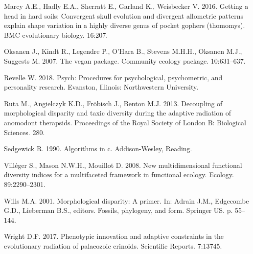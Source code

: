 \documentclass[]{article}
\begin{document}
\hypertarget{ref-marcy2016}{}
Marcy A.E., Hadly E.A., Sherratt E., Garland K., Weisbecker V. 2016.
Getting a head in hard soils: Convergent skull evolution and divergent
allometric patterns explain shape variation in a highly diverse genus of
pocket gophers (thomomys). BMC evolutionary biology. 16:207.

\hypertarget{ref-oksanen2007vegan}{}
Oksanen J., Kindt R., Legendre P., O'Hara B., Stevens M.H.H., Oksanen
M.J., Suggests M. 2007. The vegan package. Community ecology package.
10:631--637.

\hypertarget{ref-psych}{}
Revelle W. 2018. Psych: Procedures for psychological, psychometric, and
personality research. Evanston, Illinois: Northwestern University.

\hypertarget{ref-ruta2013}{}
Ruta M., Angielczyk K.D., Fröbisch J., Benton M.J. 2013. Decoupling of
morphological disparity and taxic diversity during the adaptive
radiation of anomodont therapsids. Proceedings of the Royal Society of
London B: Biological Sciences. 280.

\hypertarget{ref-sedgewick1990}{}
Sedgewick R. 1990. Algorithms in c. Addison-Wesley, Reading.

\hypertarget{ref-villuxe9ger2008}{}
Villéger S., Mason N.W.H., Mouillot D. 2008. New multidimensional
functional diversity indices for a multifaceted framework in functional
ecology. Ecology. 89:2290--2301.

\hypertarget{ref-wills2001}{}
Wills M.A. 2001. Morphological disparity: A primer. In: Adrain J.M.,
Edgecombe G.D., Lieberman B.S., editors. Fossils, phylogeny, and form.
Springer US. p. 55--144.

\hypertarget{ref-wright2017}{}
Wright D.F. 2017. Phenotypic innovation and adaptive constraints in the
evolutionary radiation of palaeozoic crinoids. Scientific Reports.
7:13745.
\end{document}
